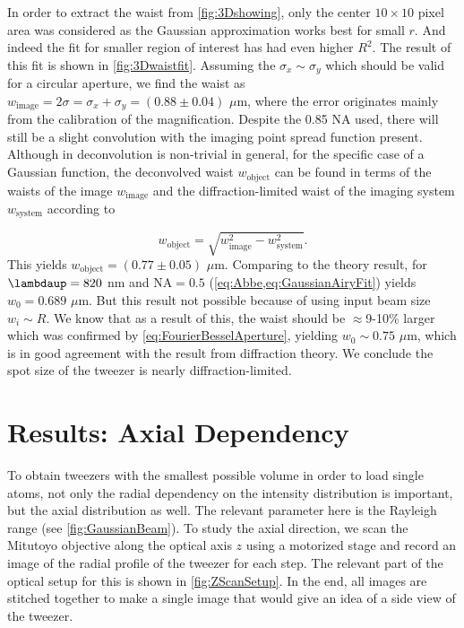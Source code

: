 In order to extract the waist from \cref{fig:3Dshowing}, only the center $10 \times 10$ pixel area was considered as the Gaussian approximation works best for small $r$. 
And indeed the fit for smaller region of interest has had even higher $R^2$.
The result of this fit is shown in \cref{fig:3Dwaistfit}.
Assuming the $\sigma_x \sim \sigma_y$ which should be valid for a circular aperture, we find the waist as $w_{\text{image}} = 2\sigma = \sigma_x + \sigma_y = (0.88 \pm 0.04)$ $\mu$m, where the error originates mainly from the calibration of the magnification. 
Despite the 0.85 NA used, there will still be a slight convolution with the imaging point spread function present. 
Although in deconvolution is non-trivial in general, for the specific case of a Gaussian function, the deconvolved waist $w_{\text{object}}$ can be found in terms of the waists of the image $w_{\text{image}}$ and the diffraction-limited waist of the imaging system $w_{\text{system}}$ according to \cite{Knottnerus2018}

\begin{equation}\label{eq:Deconvolution}
    w_{\text{object}} = \sqrt{w_{\text{image}}^2-w_{\text{system}}^2}.
\end{equation}
This yields $w_{\text{object}} = (0.77 \pm 0.05)$ $\mu$m. 
Comparing to the theory result, for $\lambdaup = 820$ nm and $\text{NA} = 0.5$ (\cref{eq:Abbe,eq:GaussianAiryFit}) yields $w_0 = 0.689$ $\mu$m. 
But this result not possible because of using input beam size $w_i \sim R$. 
We know that as a result of this, the waist should be $\approx$9-10\% larger \cite{Sortais2007,Chon2007} which was confirmed by \cref{eq:FourierBesselAperture}, yielding $w_0 \sim 0.75$ $\mu$m, which is in good agreement with the result from diffraction theory.
We conclude the spot size of the tweezer is nearly diffraction-limited.

\section{Results: Axial Dependency}\label{sec:Tweezer3D}

To obtain tweezers with the smallest possible volume in order to load single atoms, not only the radial dependency on the intensity distribution is important, but the axial distribution as well.
The relevant parameter here is the Rayleigh range (see \cref{fig:GaussianBeam}).
To study the axial direction, we scan the Mitutoyo objective along the optical axis $z$ using a motorized stage and record an image of the radial profile of the tweezer for each step.
The relevant part of the optical setup for this is shown in \cref{fig:ZScanSetup}.
In the end, all images are stitched together to make a single image that would give an idea of a side view of the tweezer.

